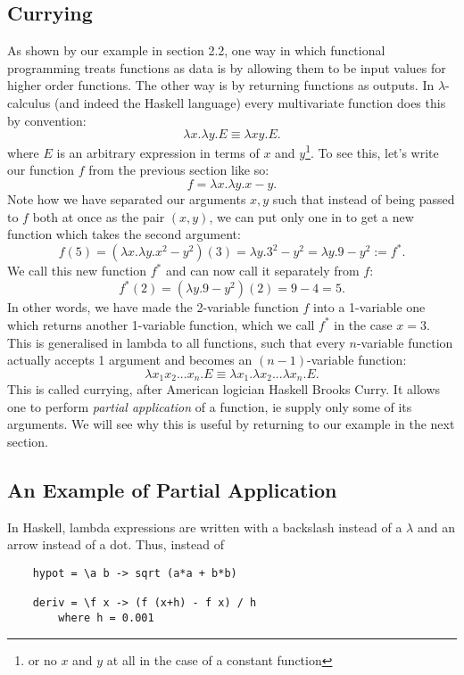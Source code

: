 \subsection{Currying}
As shown by our  example in section 2.2, one way in which functional programming treats functions as data is by allowing them to be input values for higher order functions. The other way is by returning functions as outputs. In $\lambda$-calculus (and indeed the Haskell language) every multivariate function does this by convention:
\begin{equation}
    \lambda x.\lambda y.E \equiv \lambda xy.E.
\end{equation}
where $E$ is an arbitrary expression in terms of $x$ and $y$\footnote{or no $x$ and $y$ at all in the case of a constant function}. To see this, let's write our function $f$ from the previous section like so:
\begin{equation}
    f=\lambda x.\lambda y.x-y.
\end{equation}
Note how we have separated our arguments $x, y$ such that instead of being passed to $f$ both at once as the pair $(x, y)$, we can put only one in to get a new function which takes the second argument:
\begin{equation}
    f(5)=(\lambda x.\lambda y.x^2-y^2)(3)=\lambda y.3^2-y^2=\lambda y.9-y^2:=f^*.
\end{equation}
We call this new function $f^*$ and can now call it separately from $f$:
\begin{equation}
    f^*(2)=(\lambda y.9-y^2)(2)=9-4=5.
\end{equation}
In other words, we have made the 2-variable function $f$ into a 1-variable one which returns another 1-variable function, which we call $f^*$ in the case $x=3$. This is generalised in lambda to all functions, such that every $n$-variable function actually accepts 1 argument and becomes an $(n-1)$-variable function:
\begin{equation}
    \lambda x_1x_2...x_n.E \equiv \lambda x_1.\lambda x_2...\lambda x_n.E.
\end{equation}
This is called currying, after American logician Haskell Brooks Curry\cite{LambdaAndCombinatorsIntro}. It allows one to perform {\it partial application} of a function, ie supply only some of its arguments. We will see why this is useful by returning to our  example in the next section.

\subsection{An Example of Partial Application}
In Haskell, lambda expressions are written with a backslash instead of a $\lambda$ and an arrow \code{->} instead of a dot. Thus, instead of
\begin{lstlisting}
    hypot = \a b -> sqrt (a*a + b*b)
    
    deriv = \f x -> (f (x+h) - f x) / h
        where h = 0.001
\end{lstlisting}

